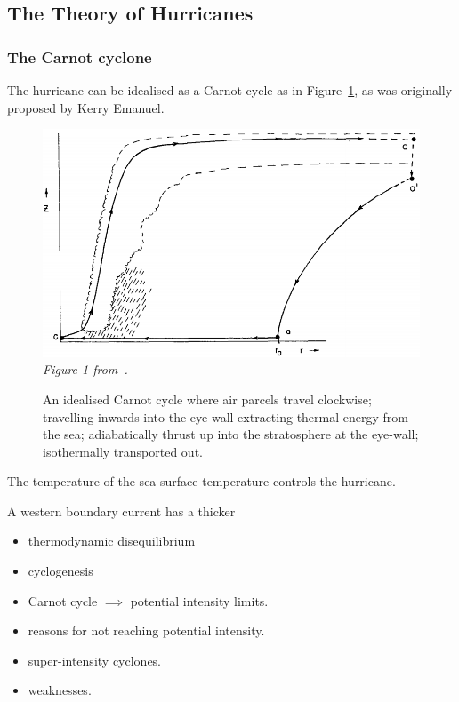
\subsection{The Theory of Hurricanes}
\label{sec:hurr-theory}
\subsubsection{The Carnot cyclone}
\label{sec:carnot}

The hurricane can be idealised as a Carnot cycle as in Figure~\ref{fig:hurricane-carnot},
as was originally proposed by Kerry Emanuel.

\begin{figure}
\centering
    \includegraphics[width=\linewidth]{images/hurricane-carnot.png}\\
    \textit{Figure 1 from~\cite{emanuel1991theory}. }
    \caption{An idealised Carnot cycle where air parcels travel clockwise;
            travelling inwards into the eye-wall extracting thermal energy
            from the sea; adiabatically thrust up into the stratosphere
            at the eye-wall; isothermally transported out. }
            \label{fig:hurricane-carnot}

\end{figure}

The temperature of the sea surface temperature controls the hurricane.

A western boundary current has a thicker

\begin{itemize}
\item thermodynamic disequilibrium
\item cyclogenesis
\item Carnot cycle $\implies$ potential intensity limits.
\item reasons for not reaching potential intensity.
\item super-intensity cyclones.
\item weaknesses.
\end{itemize}

